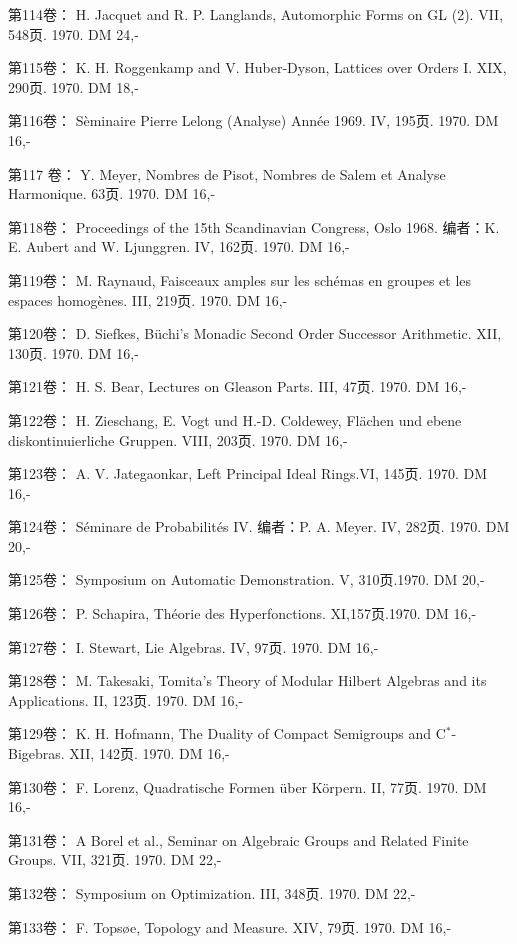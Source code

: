 第114卷： H. Jacquet and R. P. Langlands, Automorphic Forms on GL (2). VII, 548页. 1970. DM 24,-

第115卷： K. H. Roggenkamp and V. Huber-Dyson, Lattices over Orders I. XIX, 290页. 1970. DM 18,-

第116卷： Sèminaire Pierre Lelong (Analyse) Année 1969. IV, 195页. 1970. DM 16,-

第117 卷： Y. Meyer, Nombres de Pisot, Nombres de Salem et Analyse Harmonique. 63页. 1970. DM 16,-

第118卷： Proceedings of the 15th Scandinavian Congress, Oslo 1968. 编者：K. E. Aubert and W. Ljunggren. IV, 162页. 1970. DM 16,-

第119卷： M. Raynaud, Faisceaux amples sur les schémas en groupes et les espaces homogènes. III, 219页. 1970. DM 16,-

第120卷： D. Siefkes, Büchi's Monadic Second Order Successor Arithmetic. XII, 130页. 1970. DM 16,-

第121卷： H. S. Bear, Lectures on Gleason Parts. III, 47页. 1970. DM 16,-

第122卷： H. Zieschang, E. Vogt und H.-D. Coldewey, Flächen und ebene diskontinuierliche Gruppen. VIII, 203页. 1970. DM 16,-

第123卷： A. V. Jategaonkar, Left Principal Ideal Rings.VI, 145页. 1970. DM 16,-

第124卷： Séminare de Probabilités IV. 编者：P. A. Meyer. IV, 282页. 1970. DM 20,-

第125卷： Symposium on Automatic Demonstration. V, 310页.1970. DM 20,-

第126卷： P. Schapira, Théorie des Hyperfonctions. XI,157页.1970. DM 16,-

第127卷： I. Stewart, Lie Algebras. IV, 97页. 1970. DM 16,-

第128卷： M. Takesaki, Tomita's Theory of Modular Hilbert Algebras and its Applications. II, 123页. 1970. DM 16,-

第129卷： K. H. Hofmann, The Duality of Compact Semigroups and C$^*$- Bigebras. XII, 142页. 1970. DM 16,-

第130卷： F. Lorenz, Quadratische Formen über Körpern. II, 77页. 1970. DM 16,-

第131卷： A Borel et al., Seminar on Algebraic Groups and Related Finite Groups. VII, 321页. 1970. DM 22,-

第132卷： Symposium on Optimization. III, 348页. 1970. DM 22,-

第133卷： F. Topsøe, Topology and Measure. XIV, 79页. 1970. DM 16,-

